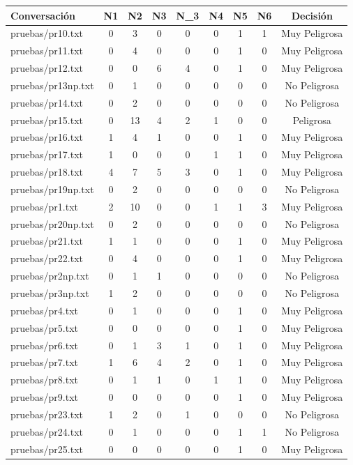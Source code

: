 \begin{table}
\begin{center}


\begin{tabular}{|l|c|c|c|c|c|c|c|c|}

\hline
Conversaci\'on & N1 & N2 & N3 & N\_3 & N4 & N5 & N6 & Decisi\'on \\
\hline
pruebas/pr10.txt &
 0 &
 3 &
 0 &
 0 &
 0 &
 1 &
 1 &
Muy Peligrosa \\
pruebas/pr11.txt &
 0 &
 4 &
 0 &
 0 &
 0 &
 1 &
 0 &
Muy Peligrosa \\ 
pruebas/pr12.txt &
 0 &
 0 &
 6 &
 4 &
 0 &
 1 &
 0 &
Muy Peligrosa \\ 
pruebas/pr13np.txt &
 0 &
 1 &
 0 &
  0 &
 0 &
 0 &
 0 &
No Peligrosa \\ 
pruebas/pr14.txt &
 0 &
 2 &
 0 &
 0 &
 0 &
 0 &
 0 &
No Peligrosa \\ 
pruebas/pr15.txt &
 0 &
 13 &
 4 &
 2 &
 1 &
 0 &
 0 &
Peligrosa \\
pruebas/pr16.txt &
 1 &
 4 &
 1 &
 0 &
 0 &
 1 &
 0 &
Muy Peligrosa \\ 
pruebas/pr17.txt &
 1 &
 0 &
 0 &
 0 &
 1 &
 1 &
 0 &
Muy Peligrosa \\ 
pruebas/pr18.txt &
 4 &
 7 &
 5 &
 3 &
 0 &
 1 &
 0 &
Muy Peligrosa \\ 
pruebas/pr19np.txt &
 0 &
 2 &
 0 &
 0 &
 0 &
 0 &
 0 &
No Peligrosa \\ 
pruebas/pr1.txt &
 2 &
 10 &
 0 &
 0 &
 1 &
 1 &
 3 &
Muy Peligrosa \\ 
pruebas/pr20np.txt &
 0 &
 2 &
 0 & 
 0 &
 0 &
 0 &
 0 &
No Peligrosa \\ 
pruebas/pr21.txt &
 1 &
 1 &
 0 &
 0 &
 0 &
 1 &
 0 &
Muy Peligrosa \\ 
pruebas/pr22.txt &
 0 &
 4 &
 0 &
 0 &
 0 & 
 1 &
 0 &
Muy Peligrosa \\ 
pruebas/pr2np.txt &
 0 &
 1 & 
 1 &
 0 &
 0 &
 0 &
 0 &
No Peligrosa \\
pruebas/pr3np.txt &
 1 &
 2 &
 0 &
 0 &
 0 &
 0 &
 0 &
No Peligrosa \\
pruebas/pr4.txt &
 0 &
 1 &
 0 &
 0 &
 0 &
 1 &
 0 &
Muy Peligrosa \\
pruebas/pr5.txt &
 0 &
 0 &
 0 &
 0 &
 0 &
 1 &
 0 &
Muy Peligrosa \\
pruebas/pr6.txt &
 0 &
 1 &
 3 &
 1 &
 0 &
 1 &
 0 &
Muy Peligrosa \\ 
pruebas/pr7.txt &
 1 &
 6 &
 4 &
 2 &
 0 &
 1 &
 0 &
Muy Peligrosa \\ 
pruebas/pr8.txt &
 0 &
 1 &
 1 &
 0 &
 1 &
 1 &
 0 &
Muy Peligrosa \\
pruebas/pr9.txt &
 0 &
 0 &
 0 &
 0 &
 0 &
 1 &
 0 &
Muy Peligrosa \\ 
pruebas/pr23.txt &
 1 &
 2 &
 0 &
 1 &
 0 &
 0 &
 0 &
No Peligrosa \\ 
pruebas/pr24.txt &
 0 &
 1 &
 0 &
 0 &
 0 &
 1 &
 1 &
No Peligrosa \\ 
pruebas/pr25.txt &
 0 &
 0 &
 0 &
 0 &
 0 &
 1 &
 0 &
Muy Peligrosa \\ 
\hline
\end{tabular}


\end{center}
\end{table}
